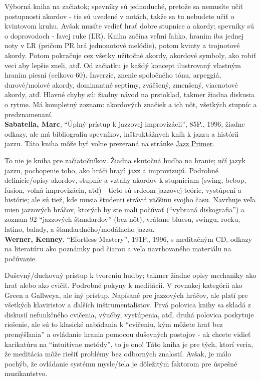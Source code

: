 \documentclass[11pt,a4paper]{book}
\begin{document}
Výborná kniha na začiatok; spevníky sú jednoduché, pretože sa nemusíte učiť postupnosti akordov - tie sú uvedené v notách, takže sa tu nebudete učiť o kvintovom kruhu. Avšak musíte vedieť hrať dobre stupnice a akordy; spevníky sú o doprovodoch - ľavej ruke (ĽR). Kniha začína veľmi ľahko, hraním iba jednej noty v ĽR (pričom PR hrá jednonotové melódie), potom kvinty a trojnotové akordy. Potom pokračuje cez všetky užitočné akordy, akordové symboly, ako robiť veci aby lepšie zneli, atď. Od začiatku je každý koncept ilustrovaný vlastným hraním piesní (celkovo 60). Inverzie, znenie spoločného tónu, arpeggiá, durové/molové akordy, dominantné septimy, zväčšený, zmenšený, viacnotové akordy, atď. Hlavné chyby sú: žiadny návod na prstoklad, takmer žiadna diskusia o rytme. Má kompletný zoznam: akordových značiek a ich nôt, všetkých stupníc a predznamenaní.
\medskip\\
\textbf{Sabatella, Marc}, “Úplný prístup k jazzovej improvizácii”, 85P., 1996, žiadne odkazy, ale má bibliografiu spevníkov, inštruktážnych kníh k jazzu a histórii jazzu. Táto kniha môže byť voľne prezeraná na stránke \href{http://www.outsideshore.com/music/a-jazz-improvisation-primer/}{Jazz Primer}.

To nie je kniha pre začiatočníkov. Žiadna skutočná hudba na hranie; učí jazyk jazzu, pochopenie toho, ako hráči hrajú jazz a improvizujú. Podrobné definície/opisy akordov, stupníc a vzťahy akordov k stupniciam (swing, bebop, fusion, voľná improvizácia, atď) - tieto sú srdcom jazzovej teórie, vystúpení a histórie; ale sú tiež, kde musia študenti stráviť väčšinu svojho času. Navrhuje veľa mien jazzových hráčov, ktorých by ste mali počúvať (“vybraná diskografia”) a zoznam 92 “jazzových štandardov” (bez nôt), vrátane bluesu, swingu, rocku, latino, balady, a štandardného/modálneho jazzu.
\medskip\\
\textbf{Werner, Kenney}, “Efortless Mastery”, 191P., 1996, s meditačným CD, odkazy na literatúru ako poznámky pod čiarou a veľa navrhovaného materiálu na počúvanie. 

Duševný/duchovný prístup k tvoreniu hudby; takmer žiadne opisy mechaniky ako hrať alebo ako cvičiť. Podrobné pokyny k meditácii. V rovnakej kategórii ako Green a Gallweya, ale iný prístup. Napísané pre jazzových hráčov, ale platí pre všetkých klaviristov a ďalších inštrumentalistov. Prvá polovica knihy sa skladá z diskusií nefunkčného cvičenia, výučby, vystúpenia, atď, druhá polovica poskytuje riešenie, ale sú to klasické nabádania k “cvičeniu, kým môžete hrať bez premýšľania” a ovládanie hrania pomocou duševných postojov - ak chcete vidieť karikatúru na “intuitívne metódy”, to je ono! Táto kniha je pre tých, ktorí veria, že meditácia môže riešiť problémy bez odborných znalostí. Avšak, je málo pochýb, že ovládanie systému mysle/tela je dôležitým faktorom pre úspešné muzikantstvo.
\end{document}
